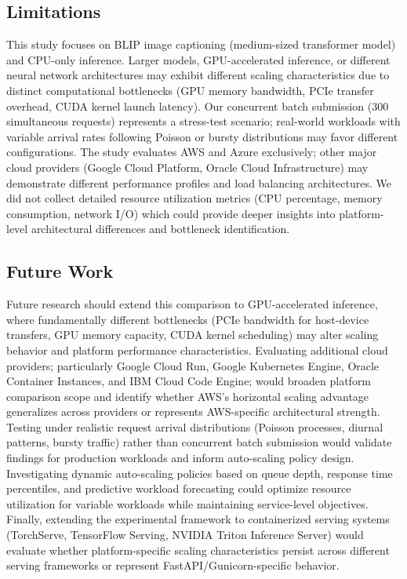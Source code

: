 \subsection{Limitations}

This study focuses on BLIP image captioning (medium-sized transformer model) and CPU-only inference. Larger models, GPU-accelerated inference, or different neural network architectures may exhibit different scaling characteristics due to distinct computational bottlenecks (GPU memory bandwidth, PCIe transfer overhead, CUDA kernel launch latency). Our concurrent batch submission (300 simultaneous requests) represents a stress-test scenario; real-world workloads with variable arrival rates following Poisson or bursty distributions may favor different configurations. The study evaluates AWS and Azure exclusively; other major cloud providers (Google Cloud Platform, Oracle Cloud Infrastructure) may demonstrate different performance profiles and load balancing architectures. We did not collect detailed resource utilization metrics (CPU percentage, memory consumption, network I/O) which could provide deeper insights into platform-level architectural differences and bottleneck identification.

\subsection{Future Work}

Future research should extend this comparison to GPU-accelerated inference, where fundamentally different bottlenecks (PCIe bandwidth for host-device transfers, GPU memory capacity, CUDA kernel scheduling) may alter scaling behavior and platform performance characteristics. Evaluating additional cloud providers; particularly Google Cloud Run, Google Kubernetes Engine, Oracle Container Instances, and IBM Cloud Code Engine; would broaden platform comparison scope and identify whether AWS's horizontal scaling advantage generalizes across providers or represents AWS-specific architectural strength. Testing under realistic request arrival distributions (Poisson processes, diurnal patterns, bursty traffic) rather than concurrent batch submission would validate findings for production workloads and inform auto-scaling policy design. Investigating dynamic auto-scaling policies based on queue depth, response time percentiles, and predictive workload forecasting could optimize resource utilization for variable workloads while maintaining service-level objectives. Finally, extending the experimental framework to containerized serving systems (TorchServe, TensorFlow Serving, NVIDIA Triton Inference Server) would evaluate whether platform-specific scaling characteristics persist across different serving frameworks or represent FastAPI/Gunicorn-specific behavior.
